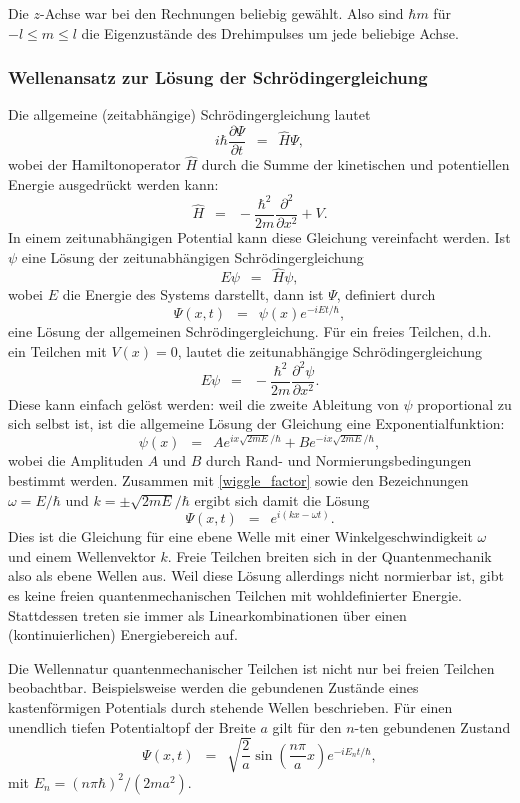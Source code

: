 \documentclass{article}
\newcommand{\widespace}{\enspace}
\newcommand{\wideeq}{\widespace = \widespace}
\newcommand{\pd}[2]{
    \frac{\partial #1}{\partial #2}
}
\begin{document}
Die $z$-Achse war bei den Rechnungen beliebig gewählt.
Also sind $\hbar m$ für $-l \leq m \leq l$ die Eigenzustände des Drehimpulses
um jede beliebige Achse.

\cite[157--161]{gri_qm}


\subsubsection{Wellenansatz zur Lösung der Schrödingergleichung}

Die allgemeine (zeitabhängige) Schrödingergleichung lautet
\[
    i \hbar \pd{\Psi}{t} \wideeq \hat H \Psi,
\]
wobei der Hamiltonoperator $\hat H$ durch die Summe der kinetischen und potentiellen
Energie ausgedrückt werden kann:
\[
    \hat H \wideeq -\frac{\hbar^2}{2m} \pd{^2}{x^2} + V.
\]
In einem zeitunabhängigen Potential kann diese Gleichung vereinfacht werden.
Ist $\psi$ eine Lösung der zeitunabhängigen Schrödingergleichung
\[
    E \psi \wideeq \hat H \psi,
\]
wobei $E$ die Energie des Systems darstellt, dann ist $\Psi$, definiert durch
\begin{equation}
    \tag{*}
    \label{wiggle_factor}
    \Psi(x, t) \wideeq \psi(x) e^{-i E t / \hbar},
\end{equation}
eine Lösung der allgemeinen Schrödingergleichung.
Für ein freies Teilchen, d.h. ein Teilchen mit $V(x) = 0$, lautet die zeitunabhängige
Schrödingergleichung
\[
    E \psi \wideeq -\frac{\hbar^2}{2m} \pd{^2 \psi}{x^2}.
\]
Diese kann einfach gelöst werden: weil die zweite Ableitung von $\psi$ proportional
zu sich selbst ist, ist die allgemeine Lösung der Gleichung eine Exponentialfunktion:
\[
    \psi(x) \wideeq A e^{i x \sqrt{2 m E} / \hbar}
    + B e^{- i x \sqrt{2 m E} / \hbar},
\]
wobei die Amplituden $A$ und $B$ durch Rand- und Normierungsbedingungen bestimmt
werden. Zusammen mit \eqref{wiggle_factor} sowie den Bezeichnungen
$\omega = E / \hbar$ und $k = \pm \sqrt{2 m E} / \hbar$ ergibt sich damit die Lösung
\[
    \Psi(x, t) \wideeq e^{i (k x - \omega t)}.
\]
Dies ist die Gleichung für eine ebene Welle mit einer Winkelgeschwindigkeit
$\omega$ und einem Wellenvektor $k$.
Freie Teilchen breiten sich in der Quantenmechanik also als ebene Wellen aus.
Weil diese Lösung allerdings nicht normierbar ist, gibt es keine
freien quantenmechanischen Teilchen mit wohldefinierter Energie.
Stattdessen treten sie immer als Linearkombinationen über einen
(kontinuierlichen) Energiebereich auf.

Die Wellennatur quantenmechanischer Teilchen ist nicht nur bei freien Teilchen
beobachtbar. Beispielsweise werden die gebundenen Zustände eines kastenförmigen
Potentials durch stehende Wellen beschrieben. Für einen unendlich tiefen
Potentialtopf der Breite $a$ gilt für den $n$-ten gebundenen Zustand
\[
    \Psi(x, t) \wideeq \sqrt{\frac 2 a} \sin \left(
        \frac{n \pi}{a} x
    \right)
    e^{-i E_n t / \hbar},
\]
mit $E_n = (n \pi \hbar)^2 / (2 m a^2)$.
\end{document}
